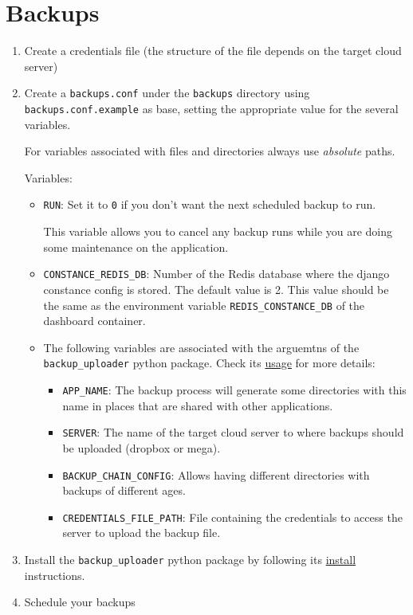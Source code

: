 \documentclass[
]{book}
\begin{document}
\hypertarget{backups}{%
\chapter{Backups}\label{backups}}

\begin{enumerate}
\def\labelenumi{\arabic{enumi}.}
\item
  Create a credentials file (the structure of the file depends on the target cloud server)
\item
  Create a \texttt{backups.conf} under the \texttt{backups} directory using \texttt{backups.conf.example} as base, setting the appropriate value for the several variables.

  For variables associated with files and directories always use \emph{absolute} paths.

  Variables:

  \begin{itemize}
  \item
    \texttt{RUN}: Set it to \texttt{0} if you don't want the next scheduled backup to run.

    This variable allows you to cancel any backup runs while you are doing some maintenance on the application.
  \item
    \texttt{CONSTANCE\_REDIS\_DB}: Number of the Redis database where the django constance config is stored. The default value is 2. This value should be the same as the environment variable \texttt{REDIS\_CONSTANCE\_DB} of the dashboard container.
  \item
    The following variables are associated with the arguemtns of the \texttt{backup\_uploader} python package. Check its \href{https://github.com/aspedrosa/BackupUploader\#usage}{usage} for more details:

    \begin{itemize}
    \item
      \texttt{APP\_NAME}: The backup process will generate some directories with this name in places that are shared with other applications.
    \item
      \texttt{SERVER}: The name of the target cloud server to where backups should be uploaded (dropbox or mega).
    \item
      \texttt{BACKUP\_CHAIN\_CONFIG}: Allows having different directories with backups of different ages.
    \item
      \texttt{CREDENTIALS\_FILE\_PATH}: File containing the credentials to access the server to upload the backup file.
    \end{itemize}
  \end{itemize}
\item
  Install the \texttt{backup\_uploader} python package by following its \href{https://github.com/aspedrosa/BackupUploader\#install}{install} instructions.
\item
  Schedule your backups


\end{enumerate}
\end{document}
